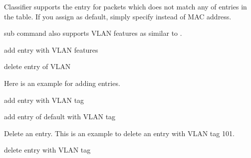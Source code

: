 \documentclass[a4paper,11pt,openany,oneside,english]{sphinxmanual}
\begin{document}
\begin{sphinxVerbatim}[commandchars=\\\{\},formatcom=\footnotesize]
\end{sphinxVerbatim}

Classifier supports the  entry for packets which does not
match any of entries in the table. If you assign  as default,
simply specify  instead of MAC address.

\begin{sphinxVerbatim}[commandchars=\\\{\},formatcom=\footnotesize]
\end{sphinxVerbatim}

 sub command also supports VLAN features as similar
to .

\begin{sphinxVerbatim}[commandchars=\\\{\},formatcom=\footnotesize]
 add entry with VLAN features

 delete entry of VLAN
\end{sphinxVerbatim}

Here is an example for adding entries.

\begin{sphinxVerbatim}[commandchars=\\\{\},formatcom=\footnotesize]
 add entry with VLAN tag

 add entry of default with VLAN tag
\end{sphinxVerbatim}

Delete an entry. This is an example to delete an entry with VLAN tag 101.

\begin{sphinxVerbatim}[commandchars=\\\{\},formatcom=\footnotesize]
 delete entry with VLAN tag
\end{sphinxVerbatim}
\end{document}
